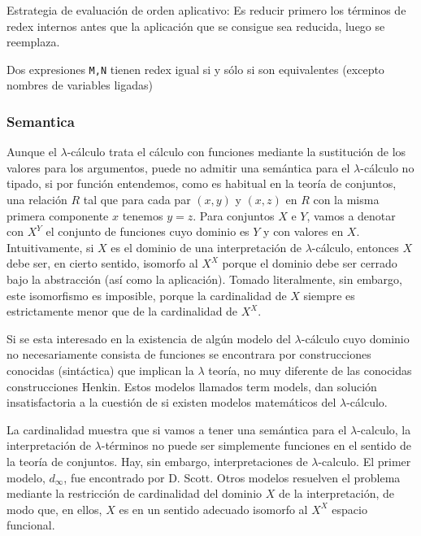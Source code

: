 Estrategia de evaluación de orden aplicativo:
Es reducir primero los términos de redex internos antes que la aplicación que se consigue sea reducida, luego se reemplaza.

\begin{thm}
Dos expresiones \texttt{M,N} tienen redex igual si y sólo si son equivalentes (excepto nombres de variables ligadas)
\end{thm}

\subsubsection{Semantica}

Aunque el $\lambda$-cálculo trata el cálculo con funciones mediante la sustitución de los valores para los argumentos, puede no admitir una semántica para el $\lambda$-cálculo no tipado, si por función entendemos, como es habitual en la teoría de conjuntos, una relación $R$ tal que para cada par $(x, y)$ y $(x, z)$ en $R$ con la misma primera componente $x$ tenemos $y = z$. Para conjuntos $X$ e $Y$, vamos a denotar con $X^Y$ el conjunto de funciones cuyo dominio es $Y$ y con valores en $X$. Intuitivamente, si $X$ es el dominio de una interpretación de 
$\lambda$-cálculo, entonces $X$ debe ser, en cierto sentido, isomorfo al $X^X$ porque el dominio debe ser cerrado bajo la abstracción (así como la aplicación). Tomado literalmente, sin embargo, este isomorfismo es imposible, porque la cardinalidad de $X$ siempre es estrictamente menor que de la cardinalidad de 
$X^X$.

Si se esta interesado en la existencia de algún modelo del 
$\lambda$-cálculo cuyo dominio no necesariamente consista de funciones se encontrara por construcciones conocidas (sintáctica) que implican la $\lambda$ teoría, no muy diferente de las conocidas construcciones Henkin. Estos modelos llamados term models, dan solución insatisfactoria a la cuestión de si existen modelos matemáticos del $\lambda$-cálculo.

La cardinalidad muestra que si vamos a tener una semántica para el 
$\lambda$-calculo, la interpretación de $\lambda$-términos no puede ser simplemente funciones en el sentido de la teoría de conjuntos. 
Hay, sin embargo, interpretaciones de $\lambda$-calculo. 
El primer modelo, $d_{\infty}$, fue encontrado por D. Scott. Otros modelos resuelven el problema mediante la restricción de cardinalidad del dominio $X$ de la interpretación, de modo que, en ellos, $X$ es en un sentido adecuado isomorfo al $X^X$ espacio funcional.

